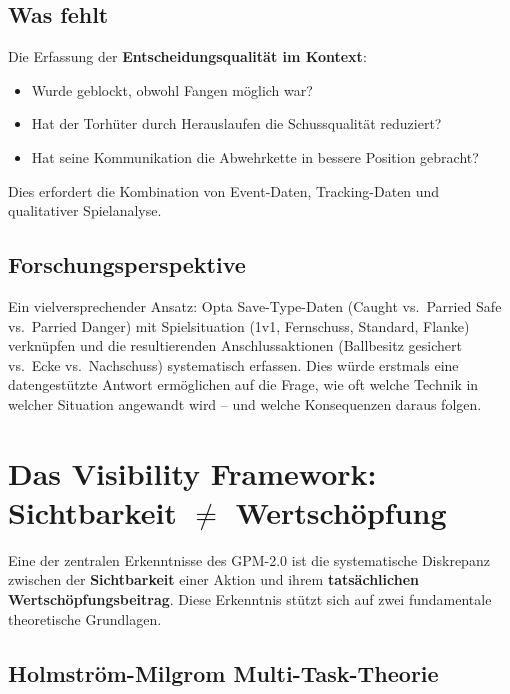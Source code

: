 \documentclass[12pt,a4paper]{article}
\begin{document}
\subsection{Was fehlt}
\label{sec:was-fehlt}

Die Erfassung der \textbf{Entscheidungsqualit\"at im Kontext}:

\begin{itemize}[nosep]
  \item Wurde geblockt, obwohl Fangen m\"oglich war?
  \item Hat der Torh\"uter durch Herauslaufen die Schussqualit\"at reduziert?
  \item Hat seine Kommunikation die Abwehrkette in bessere Position gebracht?
\end{itemize}

Dies erfordert die Kombination von Event-Daten, Tracking-Daten und qualitativer Spielanalyse.


\subsection{Forschungsperspektive}
\label{sec:forschung}

Ein vielversprechender Ansatz: Opta Save-Type-Daten (Caught vs.\ Parried Safe vs.\ Parried Danger) mit Spielsituation (1v1, Fernschuss, Standard, Flanke) verkn\"upfen und die resultierenden Anschlussaktionen (Ballbesitz gesichert vs.\ Ecke vs.\ Nachschuss) systematisch erfassen. Dies w\"urde erstmals eine datengest\"utzte Antwort erm\"oglichen auf die Frage, wie oft welche Technik in welcher Situation angewandt wird -- und welche Konsequenzen daraus folgen.


\section{Das Visibility Framework: Sichtbarkeit $\neq$ Wertsch\"opfung}
\label{sec:visibility}

Eine der zentralen Erkenntnisse des GPM-2.0 ist die systematische Diskrepanz zwischen der \textbf{Sichtbarkeit} einer Aktion und ihrem \textbf{tats\"achlichen Wertsch\"opfungsbeitrag}. Diese Erkenntnis st\"utzt sich auf zwei fundamentale theoretische Grundlagen.

\subsection{Holmstr\"om-Milgrom Multi-Task-Theorie}
\label{sec:holmstrom}
\end{document}
